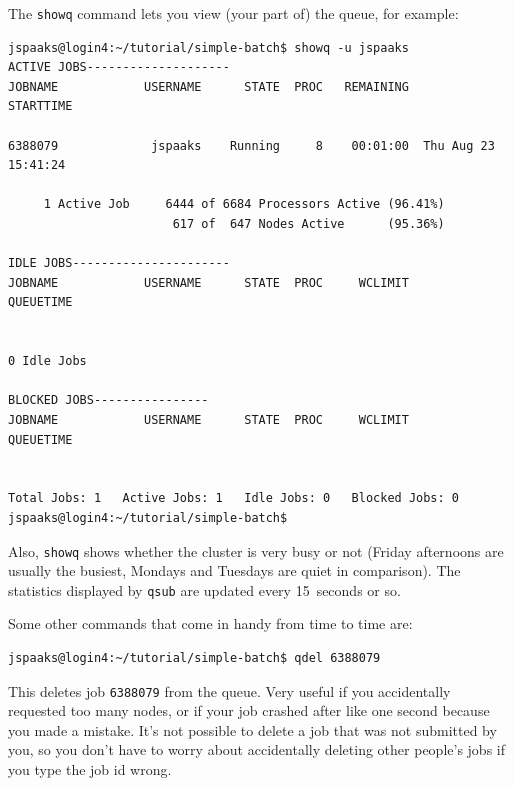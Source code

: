 The \lstinline[style=bashinline]{showq} command lets you view (your part of) the queue, for example:
\begin{lstlisting}[style=basic,style=bash]
jspaaks@login4:~/tutorial/simple-batch$ showq -u jspaaks
ACTIVE JOBS--------------------
JOBNAME            USERNAME      STATE  PROC   REMAINING            STARTTIME

6388079             jspaaks    Running     8    00:01:00  Thu Aug 23 15:41:24

     1 Active Job     6444 of 6684 Processors Active (96.41%)
                       617 of  647 Nodes Active      (95.36%)

IDLE JOBS----------------------
JOBNAME            USERNAME      STATE  PROC     WCLIMIT            QUEUETIME


0 Idle Jobs

BLOCKED JOBS----------------
JOBNAME            USERNAME      STATE  PROC     WCLIMIT            QUEUETIME


Total Jobs: 1   Active Jobs: 1   Idle Jobs: 0   Blocked Jobs: 0
jspaaks@login4:~/tutorial/simple-batch$ 
\end{lstlisting}
Also, \lstinline[style=bashinline]{showq} shows whether the cluster is very busy or not (Friday afternoons are usually the busiest, Mondays and Tuesdays are quiet in comparison). The statistics displayed by \lstinline[style=bashinline]{qsub} are updated every 15~seconds or so.


Some other commands that come in handy from time to time are:
\begin{lstlisting}[style=basic,style=bash]
jspaaks@login4:~/tutorial/simple-batch$ qdel 6388079
\end{lstlisting}
This deletes job \lstinline[style=bashinline]{6388079} from the queue. Very useful if you accidentally requested too many nodes, or if your job crashed after like one second because you made a mistake. It's not possible to delete a job that was not submitted by you, so you don't have to worry about accidentally deleting other people's jobs if you type the job id wrong.

\vspace{1em}

